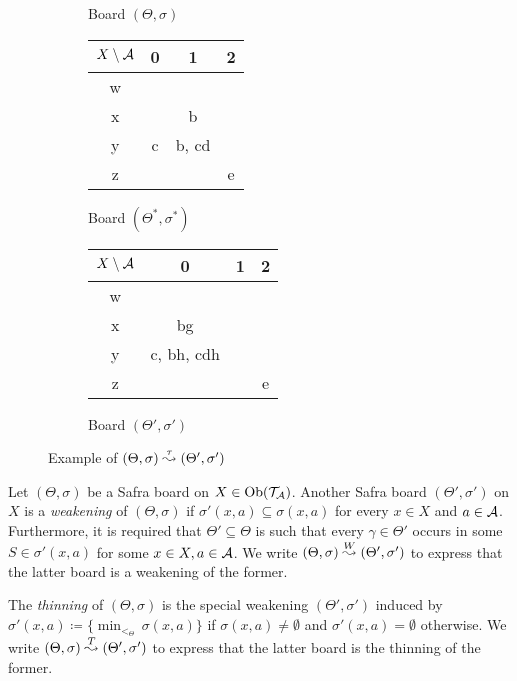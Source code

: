 \begin{example}
\begin{figure}[h]
\begin{subfigure}[b]{0.3\textwidth}
\begin{tabular}{|c|c|c|c|}
        \hline
      \end{tabular}
      \caption{Board $(\Theta, \sigma)$}
      \label{fig:t-succ-a}
    \end{subfigure}
    \begin{subfigure}[b]{0.3\textwidth}
      \centering
      \begin{tabular}{|c|c|c|c|}
        \hline
        $X \setminus \mathcal{A}$& 0 & 1 & 2 \\
        \hline
        w & & & \\
        \hline
        x & & b & \\
        \hline
        y & c & b, cd & \\
        \hline
        z & & & e \\
        \hline
      \end{tabular}
      \caption{Board $(\Theta^*, \sigma^*)$}
      \label{fig:t-succ-b}
    \end{subfigure}
    \begin{subfigure}[b]{0.3\textwidth}
      \centering
      \begin{tabular}{|c|c|c|c|}
        \hline
        $X \setminus \mathcal{A}$& 0 & 1 & 2 \\
        \hline
        w & & & \\
        \hline
        x & bg & & \\
        \hline
        y & c, bh, cdh & & \\
        \hline
        z & & & e \\
        \hline
      \end{tabular}
      \caption{Board $(\Theta', \sigma')$}
      \label{fig:t-succ-c}
    \end{subfigure}
    
    \caption{Example of $(\Theta, \sigma) \stackrel{\tau}{\leadsto} (\Theta', \sigma')$}
    \label{fig:t-succ}
  \end{figure}
\end{example}

\begin{definition}\label{def:weakening}
  Let $(\Theta, \sigma)$ be a Safra board on $X \in \mathrm{Ob}(\mathcal{T}_{\mathcal{A}})$. Another
  Safra board $(\Theta', \sigma')$ on $X$ is a \emph{weakening} of $(\Theta, \sigma)$
  if $\sigma'(x, a) \subseteq \sigma(x, a)$ for every $x \in X$ and $a \in \mathcal{A}$.
  Furthermore, it is required that $\Theta' \subseteq \Theta$ is such that every $\gamma
  \in \Theta'$ occurs in some $S \in \sigma'(x, a)$ for some $x \in X, a \in \mathcal{A}$.
  We write $(\Theta, \sigma)
  \stackrel{W}{\leadsto} (\Theta', \sigma')$ to express that the latter board is a weakening
  of the former.

  The \emph{thinning} of $(\Theta, \sigma)$ is the special weakening $(\Theta',
  \sigma')$ induced by
  \(\sigma'(x, a) \coloneq \{\min_{<_\Theta}\,\sigma(x, a)\}\) if $\sigma(x, a)
  \neq \emptyset$ and $\sigma'(x, a) = \emptyset$ otherwise.
  We write $(\Theta, \sigma) \stackrel{T}{\leadsto} (\Theta',
  \sigma')$ to express that the latter board is the thinning of the former.
\end{definition}

